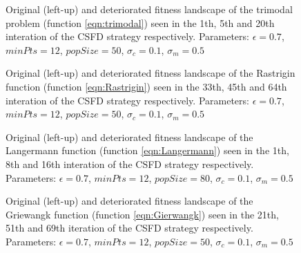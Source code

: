 \begin{figure}
  \centering
  \caption{Original (left-up) and deteriorated fitness landscape 
  of the trimodal problem (function \ref{eqn:trimodal}) seen in the
  1th, 5th and 20th interation of the CSFD strategy respectively. 
  Parameters: $\epsilon=0.7$, $minPts=12$, $popSize=50$,
  $\sigma_c=0.1$, $\sigma_m=0.5$}
  \label{fig:3modTest}
\end{figure}

\begin{figure}
  \centering
  \caption{Original (left-up) and deteriorated fitness landscape 
  of the Rastrigin function (function \ref{eqn:Rastrigin}) seen in the 33th,
  45th and 64th interation of the CSFD strategy respectively. 
  Parameters: $\epsilon=0.7$, $minPts=12$, $popSize=50$,
  $\sigma_c=0.1$, $\sigma_m=0.5$}
  \label{fig:rastriginTest}
\end{figure}


\begin{figure}
  \centering
  \caption{Original (left-up) and deteriorated fitness landscape 
  of the Langermann function (function \ref{eqn:Langermann}) seen in the 1th,
  8th and 16th interation of the CSFD strategy respectively. 
  Parameters: $\epsilon=0.7$, $minPts=12$, $popSize=80$,
  $\sigma_c=0.1$, $\sigma_m=0.5$}
  \label{fig:langermannTest}
\end{figure}

\begin{figure}
  \centering
  \caption{Original (left-up) and deteriorated fitness landscape 
  of the Griewangk function (function \ref{eqn:Gierwangk}) seen in the 21th,
  51th and 69th iteration of the CSFD strategy respectively. 
  Parameters: $\epsilon=0.7$, $minPts=12$, $popSize=50$,
  $\sigma_c=0.1$, $\sigma_m=0.5$}
  \label{fig:griewangkTest}
\end{figure}
